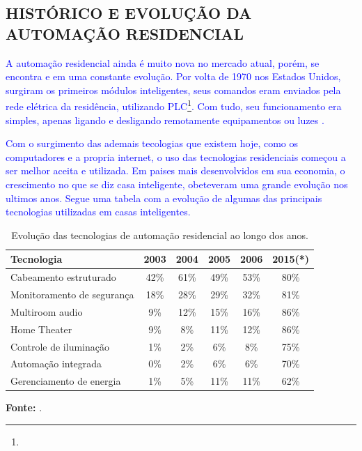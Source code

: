     

    \subsection{HISTÓRICO E EVOLUÇÃO DA AUTOMAÇÃO RESIDENCIAL}
        \textcolor{blue}{A automação residencial ainda é muito nova no mercado atual, porém, se encontra e em uma constante evolução. Por volta de 1970 nos Estados Unidos, surgiram os primeiros módulos inteligentes, seus comandos eram enviados pela rede elétrica da residência, utilizando PLC\footnote{}. Com tudo, seu funcionamento era simples, apenas ligando e desligando remotamente equipamentos ou luzes \cite{automacaoResidencialCap1}.}

        \textcolor{blue}{Com o surgimento das ademais tecologias que existem hoje, como os computadores e a propria internet, o uso das tecnologias residenciais começou a ser melhor aceita e utilizada. Em paises mais desenvolvidos em sua economia, o crescimento no que se diz casa inteligente, obeteveram uma grande evolução nos ultimos anos. Segue uma tabela com a evolução de algumas das principais tecnologias utilizadas em casas inteligentes.}

        \begin{table}[H]
            \centering
            \renewcommand{\arraystretch}{1.3}
            \setlength{\tabcolsep}{10pt}
            \begin{tabular}{lccccc}
            \hline
            \textbf{Tecnologia} & \textbf{2003} & \textbf{2004} & \textbf{2005} & \textbf{2006} & \textbf{2015(*)} \\
            \hline
            Cabeamento estruturado & 42\% & 61\% & 49\% & 53\% & 80\% \\
            Monitoramento de segurança & 18\% & 28\% & 29\% & 32\% & 81\% \\
            Multiroom audio & 9\% & 12\% & 15\% & 16\% & 86\% \\
            Home Theater & 9\% & 8\% & 11\% & 12\% & 86\% \\
            Controle de iluminação & 1\% & 2\% & 6\% & 8\% & 75\% \\
            Automação integrada & 0\% & 2\% & 6\% & 6\% & 70\% \\
            Gerenciamento de energia & 1\% & 5\% & 11\% & 11\% & 62\% \\
            \hline
            \end{tabular}
            \caption{Evolução das tecnologias de automação residencial ao longo dos anos.}
            \label{tab:tecnologias-automacao}

            \vspace{0.5em}
            \small
            \textbf{Fonte:} \cite{automacaoResidencialCap1}.\\
        \end{table}


